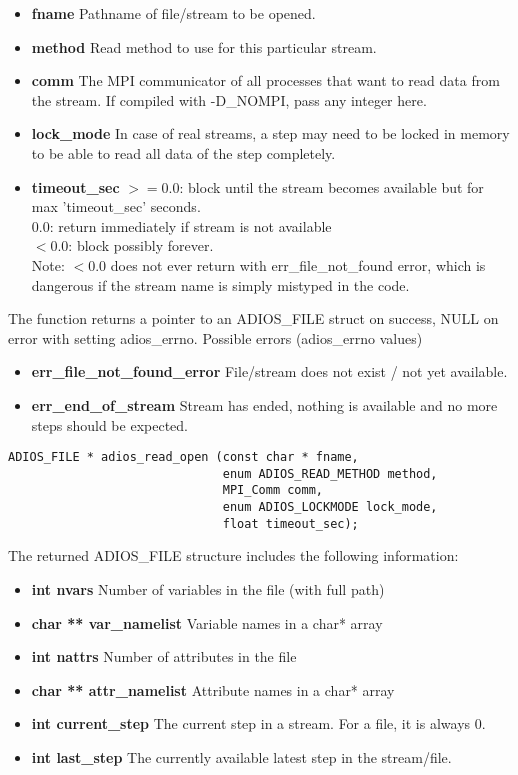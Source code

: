 \begin{itemize}
\item{\bf fname}  Pathname of file/stream to be opened.
\item{\bf method}  Read method to use for this particular stream.
\item{\bf comm}    The MPI communicator of all processes that want to read data from the stream.
If compiled with -D\_NOMPI, pass any integer here.
\item{\bf lock\_mode} In case of real streams, a step may need to be locked in memory to be able
to read all data of the step completely.
\item{\bf timeout\_sec}  $>=0.0$: block until the stream becomes available but 
for max 'timeout\_sec' seconds.\\
$0.0$: return immediately if stream is not available\\
$<0.0$: block possibly forever.\\
Note: $<0.0$ does not ever return with err\_file\_not\_found error, 
which is dangerous if the stream name is simply mistyped in the code.
\end{itemize}

\noindent The function returns a pointer to an ADIOS\_FILE struct on success, NULL on error with setting adios\_errno. 
Possible errors (adios\_errno values)

\begin{itemize}
\item{\bf err\_file\_not\_found\_error}  File/stream does not exist / not yet available.
\item{\bf err\_end\_of\_stream}  Stream has ended, nothing is available and no more steps should be expected.
\end{itemize}


\begin{lstlisting}[alsolanguage=C]
ADIOS_FILE * adios_read_open (const char * fname, 
                              enum ADIOS_READ_METHOD method, 
                              MPI_Comm comm, 
                              enum ADIOS_LOCKMODE lock_mode,
                              float timeout_sec);
\end{lstlisting}

\noindent The returned ADIOS\_FILE structure includes the following information:

\begin{itemize}
\item{\bf int nvars}   Number of variables in the file (with full path)
\item{\bf char ** var\_namelist}   Variable names in a char* array
\item{\bf int nattrs}  Number of attributes in the file
\item{\bf char ** attr\_namelist}  Attribute names in a char* array
\item{\bf int current\_step}  The current step in a stream. For a file, it is always 0. 
\item{\bf int last\_step}     The currently available latest step in the stream/file.  
\end{itemize}


